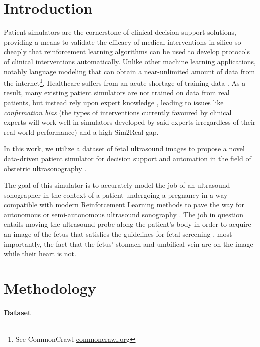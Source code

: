 \section{Introduction}

Patient simulators are the cornerstone of clinical decision support solutions, providing a means to validate the efficacy of medical interventions in silico so cheaply that reinforcement learning algorithms can be used to develop protocols of clinical interventions automatically.
Unlike other machine learning applications, notably language modeling that can obtain a near-unlimited amount of data from the internet\footnote{See CommonCrawl \cite{commoncrawl} \url{commoncrawl.org}}, Healthcare suffers from an acute shortage of training data \cite{datashortage}.
As a result, many existing patient simulators are not trained on data from real patients, but instead rely upon expert knowledge \cite{liventsevEffectivePatientSimulators2021}, leading to issues like \emph{confirmation bias} (the types of interventions currently favoured by clinical experts will work well in simulators developed by said experts irregardless of their real-world performance) and a high Sim2Real \cite{sim2real} gap.

In this work, we utilize a dataset of fetal ultrasound images to propose a novel data-driven patient simulator for decision support and automation in the field of obstetric ultrasonography \cite{obstetrics-sonography}.

The goal of this simulator is to accurately model the job of an ultrasound sonographer in the context of a patient undergoing a pregnancy in a way compatible with modern Reinforcement Learning methods \cite{liDeepReinforcementLearning2017}
to pave the way for autonomous or semi-autonomous ultrasound sonography \cite{autonomous-ultrasound-review}.
The job in question entails moving the ultrasound probe along the patient's body in order to acquire an image of the fetus that satisfies the guidelines for fetal-screening \cite{isoug-guidelines}, most importantly, the fact that the fetus' stomach and umbilical vein are on the image while their heart is not.

\newpage
\section{Methodology}

\paragraph{Dataset}

